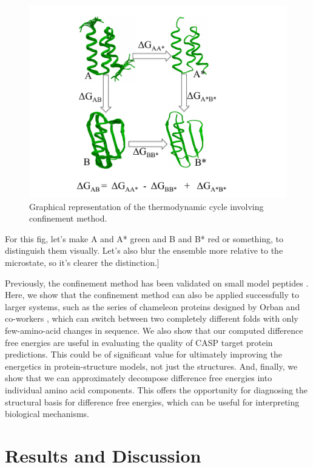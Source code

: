 \documentclass[12pt]{article}
\newcommand{\Ken}[1]{\color{red}#1\normalcolor}
\begin{document}
\begin{figure}
\begin{center}
\includegraphics[width=3.5 in,height=3.5 in]{method.pdf}
\end{center}
\caption{Graphical representation of the thermodynamic cycle involving confinement method.}
\label{fig:method}
\end{figure}

\Ken{For this fig, let's make A and A* green and B and B* red or something, to distinguish them visually.  Let's also blur the ensemble more relative to the microstate, so it's clearer the distinction.]}




Previously, the confinement method has been validated on small model peptides \cite{Tyka2006,Cecchini2009}. Here, we show that the confinement 
method can also be applied successfully to larger systems, such as the series of chameleon proteins designed by Orban and co-workers
\cite{Alexander2007,He2008,Alexander2009,He2012}, which can switch between two completely different folds with only few-amino-acid changes 
in sequence.  We also show that our computed difference free energies are useful in evaluating the quality of CASP target protein predictions.  
This could be of significant value for ultimately improving the energetics in protein-structure models, not just the structures.  And, 
finally, we show that we can approximately decompose difference free energies into individual amino acid components.  This offers the 
opportunity for diagnosing the structural basis for difference free energies, which can be useful for interpreting biological mechanisms. 

\section{Results and Discussion}
\end{document}
